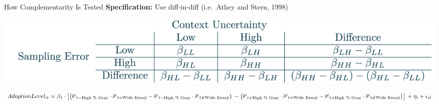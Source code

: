 \documentclass[
  ignorenonframetext,
]{beamer}
\begin{document}
\begin{frame}{How Complementarity Is Tested}
\protect\hypertarget{how-complementarity-is-tested-1}{}
\textbf{Specification:} Use diff-in-diff (i.e.~Athey and Stern, 1998)

\includegraphics[width=15.625in,height=\textheight]{diffindifftab.png}

\[
AdoptionLevel_{it} = \\
 \beta_1 \cdot \left[
  \left(
  \mathbb{1}_{t = \text{High } \% \text{ Gray}}\cdot \mathbb{1}_{t = \text{Wide} \text{ Emoji}} 
- \mathbb{1}_{t = \text{High } \% \text{ Gray}}\cdot  \mathbb{1}_{t \neq \text{Wide} \text{ Emoji}} 
\right) \\ -  \left(
  \mathbb{1}_{t \neq \text{High } \% \text{ Gray}}\cdot \mathbb{1}_{t = \text{Wide} \text{ Emoji}} 
- \mathbb{1}_{t \neq \text{High } \% \text{ Gray}}\cdot  \mathbb{1}_{t \neq \text{Wide} \text{ Emoji}} 
\right)
\right] \\ 
+ \eta_i + \epsilon_{it}
\]
\end{frame}
\end{document}
